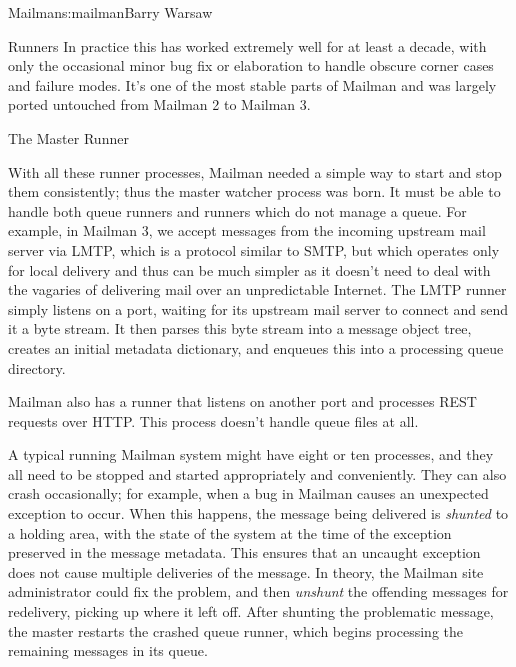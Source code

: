 \begin{aosachapter}{Mailman}{s:mailman}{Barry Warsaw}
\begin{aosasect1}{Runners}
In practice this has worked extremely well for at least a decade, with
only the occasional minor bug fix or elaboration to handle obscure
corner cases and failure modes.  It's one of the most stable parts of
Mailman and was largely ported untouched from Mailman 2 to Mailman 3.

\end{aosasect1}

\begin{aosasect1}{The Master Runner}

With all these runner processes, Mailman needed a simple way to start
and stop them consistently;  thus the master watcher process was born.
It must be able to handle both queue runners and runners which do
not manage a queue.  For example, in Mailman 3, we accept messages
from the incoming upstream mail server via LMTP, which is a protocol
similar to SMTP, but which operates only for local delivery and thus
can be much simpler as it doesn't need to deal with the vagaries of
delivering mail over an unpredictable Internet.  The LMTP runner
simply listens on a port, waiting for its upstream mail server to
connect and send it a byte stream.  It then parses this byte stream
into a message object tree, creates an initial metadata dictionary,
and enqueues this into a processing queue directory.

Mailman also has a runner that listens on another port and processes
REST requests over HTTP.  This process doesn't handle queue files at
all.

A typical running Mailman system might have eight or ten processes, and
they all need to be stopped and started appropriately and
conveniently.  They can also crash occasionally; for example, when a
bug in Mailman causes an unexpected exception to occur.  When this
happens, the message being delivered is \emph{shunted} to a holding
area, with the state of the system at the time of the exception
preserved in the message metadata.  This ensures that an uncaught
exception does not cause multiple deliveries of the message.  In
theory, the Mailman site administrator could fix the problem, and then
\emph{unshunt} the offending messages for redelivery, picking up where
it left off.  After shunting the problematic message, the master
restarts the crashed queue runner, which begins processing the
remaining messages in its queue.


\end{aosasect1}
\end{aosachapter}
